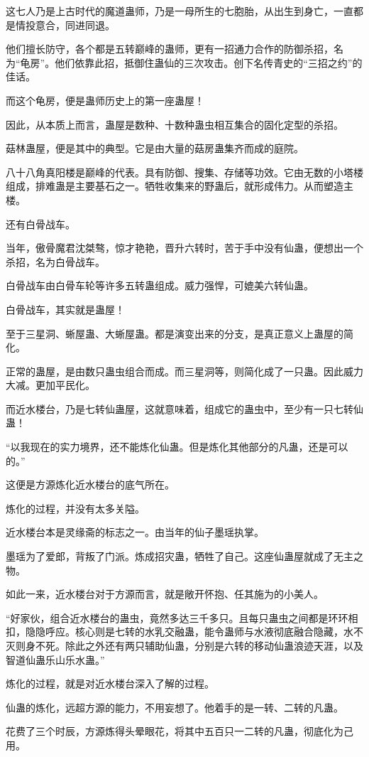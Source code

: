 \begin{this_body}
这七人乃是上古时代的魔道蛊师，乃是一母所生的七胞胎，从出生到身亡，一直都是情投意合，同进同退。

他们擅长防守，各个都是五转巅峰的蛊师，更有一招通力合作的防御杀招，名为“龟房”。他们依靠此招，抵御住蛊仙的三次攻击。创下名传青史的“三招之约”的佳话。

而这个龟房，便是蛊师历史上的第一座蛊屋！

因此，从本质上而言，蛊屋是数种、十数种蛊虫相互集合的固化定型的杀招。

菇林蛊屋，便是其中的典型。它是由大量的菇房蛊集齐而成的庭院。

八十八角真阳楼是巅峰的代表。具有防御、搜集、存储等功效。它由无数的小塔楼组成，排难蛊是主要基石之一。牺牲收集来的野蛊后，就形成伟力。从而塑造主楼。

还有白骨战车。

当年，傲骨魔君沈桀骜，惊才艳艳，晋升六转时，苦于手中没有仙蛊，便想出一个杀招，名为白骨战车。

白骨战车由白骨车轮等许多五转蛊组成。威力强悍，可媲美六转仙蛊。

白骨战车，其实就是蛊屋！

至于三星洞、蜥屋蛊、大蜥屋蛊。都是演变出来的分支，是真正意义上蛊屋的简化。

正常的蛊屋，是由数只蛊虫组合而成。而三星洞等，则简化成了一只蛊。因此威力大减。更加平民化。

而近水楼台，乃是七转仙蛊屋，这就意味着，组成它的蛊虫中，至少有一只七转仙蛊！

“以我现在的实力境界，还不能炼化仙蛊。但是炼化其他部分的凡蛊，还是可以的。”

这便是方源炼化近水楼台的底气所在。

炼化的过程，并没有太多关隘。

近水楼台本是灵缘斋的标志之一。由当年的仙子墨瑶执掌。

墨瑶为了爱郎，背叛了门派。炼成招灾蛊，牺牲了自己。这座仙蛊屋就成了无主之物。

如此一来，近水楼台对于方源而言，就是敞开怀抱、任其施为的小美人。

“好家伙，组合近水楼台的蛊虫，竟然多达三千多只。且每只蛊虫之间都是环环相扣，隐隐呼应。核心则是七转的水乳交融蛊，能令蛊师与水液彻底融合隐藏，水不灭则身不死。除此之外还有两只辅助仙蛊，分别是六转的移动仙蛊浪迹天涯，以及智道仙蛊乐山乐水蛊。”

炼化的过程，就是对近水楼台深入了解的过程。

仙蛊的炼化，远超方源的能力，不用妄想了。他着手的是一转、二转的凡蛊。

花费了三个时辰，方源炼得头晕眼花，将其中五百只一二转的凡蛊，彻底化为己用。


\end{this_body}
